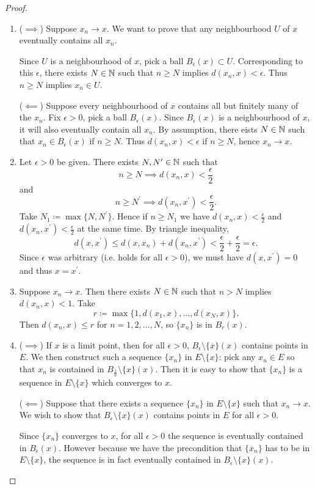 \begin{proof} \
\begin{enumerate}[label=(\arabic*)]
\item ($\implies$) Suppose $x_n\to x$. We want to prove that any neighbourhood $U$ of $x$ eventually contains all $x_n$.

Since $U$ is a neighbourhood of $x$, pick a ball $B_\epsilon(x)\subset U$. Corresponding to this $\epsilon$, there exists $N\in\mathbb N$ such that $n\ge N$ implies $d(x_n,x)<\epsilon$. Thus $n\ge N$ implies $x_n\in U$.

($\impliedby$) Suppose every neighbourhood of $x$ contains all but finitely many of the $x_n$. Fix $\epsilon>0$, pick a ball $B_\epsilon(x)$. Since $B_\epsilon(x)$ is a neighbourhood of $x$, it will also eventually contain all $x_n$. By assumption, there eists $N\in\mathbb N$ such that $x_n\in B_\epsilon(x)$ if $n\ge N$. Thus $d(x_n,x)<\epsilon$ if $n\ge N$, hence $x_n\to x$.

\item Let $\epsilon>0$ be given. There exists $N,N^\prime\in\mathbb N$ such that
\[n\ge N\implies d(x_n,x)<\frac{\epsilon}{2}\]
and
\[n\ge N^\prime\implies d(x_n,x^\prime)<\frac{\epsilon}{2}.\]
Take $N_1\coloneqq\max\{N,N^\prime\}$. Hence if $n\ge N_1$ we have $d(x_n,x)<\frac{\epsilon}{2}$ and $d(x_n,x^\prime)<\frac{\epsilon}{2}$ at the same time. By triangle inequality,
\[ d(x,x^\prime)\le d(x,x_n)+d(x_n,x^\prime)<\frac{\epsilon}{2}+\frac{\epsilon}{2}=\epsilon.\]
Since $\epsilon$ was arbitrary (i.e. holds for all $\epsilon>0$), we must have $d(x,x^\prime)=0$ and thus $x=x^\prime$.

\item Suppose $x_n\to x$. Then there exists $N\in\mathbb N$ such that $n>N$ implies $d(x_n,x)<1$. Take
\[r\coloneqq\max\{1,d(x_1,x),\dots,d(x_N,x)\}.\]
Then $d(x_n,x)\le r$ for $n=1,2,\dots,N$, so $\{x_n\}$ is in $B_r(x)$.

\item ($\implies$) If $x$ is a limit point, then for all $\epsilon>0$, $B_\epsilon\setminus\{x\}(x)$ contains points in $E$. We then construct such a sequence $\{x_n\}$ in $E\setminus\{x\}$: pick any $x_n\in E$ so that $x_n$ is contained in $B_\frac{1}{n}\setminus\{x\}(x)$. Then it is easy to show that $\{x_n\}$ is a sequence in $E\setminus\{x\}$ which converges to $x$.

($\impliedby$) Suppose that there exists a sequence $\{x_n\}$ in $E\setminus\{x\}$ such that $x_n\to x$. We wish to show that $B_\epsilon\setminus\{x\}(x)$ contains points in $E$ for all $\epsilon>0$.

Since $\{x_n\}$ converges to $x$, for all $\epsilon>0$ the sequence is eventually contained in $B_\epsilon(x)$. However because we have the precondition that $\{x_n\}$ has to be in $E\setminus\{x\}$, the sequence is in fact eventually contained in $B_\epsilon\setminus\{x\}(x)$.
\end{enumerate}
\end{proof}

